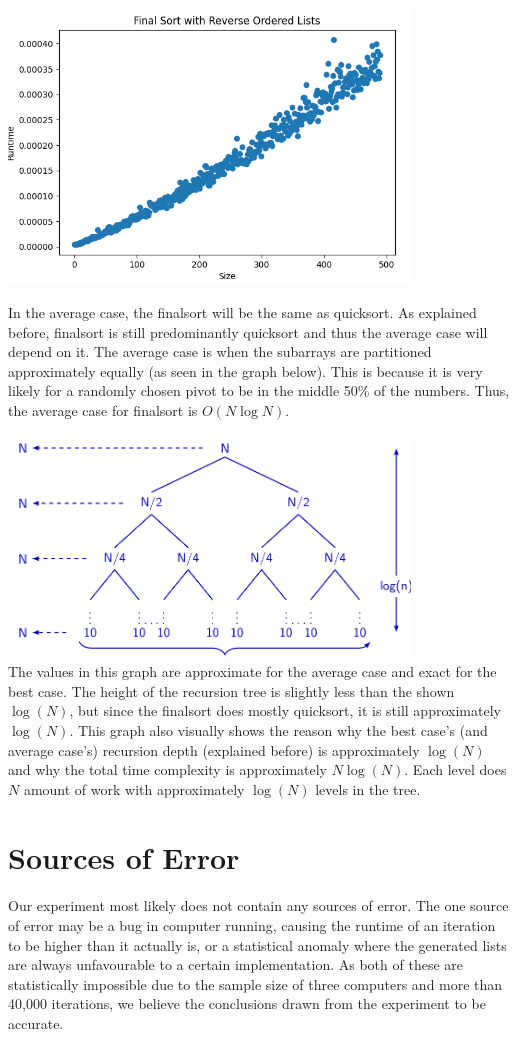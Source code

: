 \documentclass{article}
\begin{document}
\includegraphics[width=0.8\textwidth]{finalSortRandomLists}

In the average case, the finalsort will be the same as quicksort. As explained before, finalsort is still predominantly quicksort and thus the average case will depend on it. The average case is when the subarrays are partitioned approximately equally (as seen in the graph below). This is because it is very likely for a randomly chosen pivot to be in the middle 50\% of the numbers. Thus, the average case for finalsort is $O(N\log N)$.

\includegraphics[width=0.8\textwidth]{bestCase}\\
The values in this graph are approximate for the average case and exact for the best case. The height of the recursion tree is slightly less than the shown $\log(N)$, but since the finalsort does mostly quicksort, it is still approximately $\log(N)$. This graph also visually shows the reason why the best case's (and average case's) recursion depth (explained before) is approximately $\log(N)$ and why the total time complexity is approximately $N\log(N)$. Each level does $N$ amount of work with approximately $\log(N)$ levels in the tree.


\section*{Sources of Error}
Our experiment most likely does not contain any sources of error. The one source of error may be a bug in computer running, causing the runtime of an iteration to be higher than it actually is, or a statistical anomaly where the generated lists are always unfavourable to a certain implementation. As both of these are statistically impossible due to the sample size of three computers and more than 40,000 iterations, we believe the conclusions drawn from the experiment to be accurate.
\end{document}
